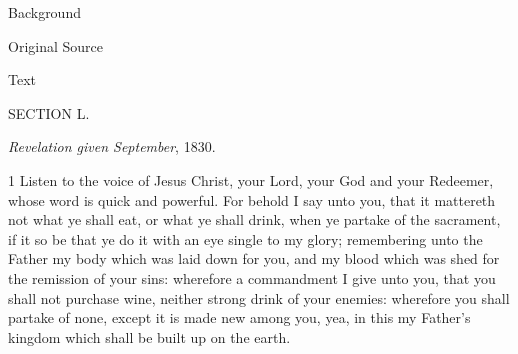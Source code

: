 			\begin{description}
				\item[Background]
			\end{description}
			
			
			\begin{description}
				\item[Original Source]
			\end{description}
			
			
			\begin{description}
				\item[Text]
			\end{description}
			
				\begin{tightcenter}
				SECTION L.

				\textit{Revelation given September}, 1830.
				\end{tightcenter}

				1 Listen to the voice of Jesus Christ, your Lord, your God and your Redeemer, whose word is quick and powerful. For behold I say unto you, that it mattereth not what ye shall eat, or what ye shall drink, when ye partake of the sacrament, if it so be that ye do it with an eye single to my glory; remembering unto the Father my body which was laid down for you, and my blood which was shed for the remission of your sins: wherefore a commandment I give unto you, that you shall not purchase wine, neither strong drink of your enemies: wherefore you shall partake of none, except it is made new among you, yea, in this my Father's kingdom which shall be built up on the earth.

